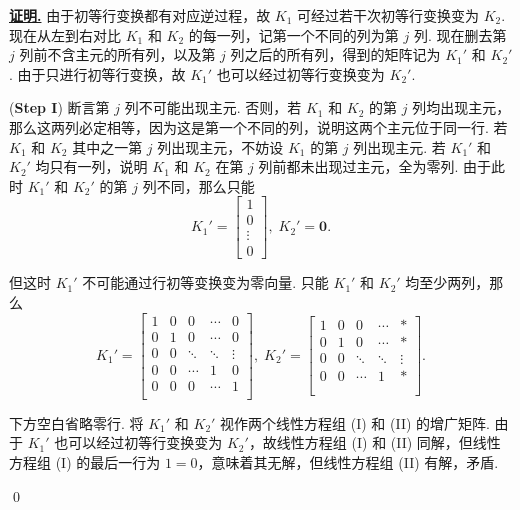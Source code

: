 \documentclass[10pt,openany]{article}
\theoremstyle{thmstyle} %
\theoremstyle{defstyle} %
\theoremstyle{prostyle} %
\theoremstyle{exastyle}
\theoremstyle{remstyle}
\renewenvironment{proof}[1][证明]{\par\underline{\textbf{#1.}} \;\fangsong}{\qed\par}
\begin{document}
\begin{proof}
	由于初等行变换都有对应逆过程，故 \( K_1 \) 可经过若干次初等行变换变为 \( K_2 \). 现在从左到右对比 \( K_1 \) 和 \( K_2 \) 的每一列，记第一个不同的列为第 \( j \) 列. 现在删去第 \( j \) 列前不含主元的所有列，以及第 \( j \) 列之后的所有列，得到的矩阵记为 \( K_1' \) 和 \( K_2' \). 由于只进行初等行变换，故 \( K_1' \) 也可以经过初等行变换变为 \( K_2' \).
	
	(\textbf{Step I}) 断言第 \( j \) 列不可能出现主元. 否则，若 \( K_1 \) 和 \( K_2 \) 的第 \( j \) 列均出现主元，那么这两列必定相等，因为这是第一个不同的列，说明这两个主元位于同一行. 若 \( K_1 \) 和 \( K_2 \) 其中之一第 \( j \) 列出现主元，不妨设 \( K_1 \) 的第 \( j \) 列出现主元. 若 \( K_1' \) 和 \( K_2' \) 均只有一列，说明 \( K_1 \) 和 \( K_2 \) 在第 \( j \) 列前都未出现过主元，全为零列. 由于此时 \( K_1' \) 和 \( K_2' \) 的第 \( j \) 列不同，那么只能
	\[ K_1'= \begin{bmatrix}
		1 \\ 0 \\ \vdots \\ 0
	\end{bmatrix}, \; K_2'= \bm{0}. \]
	
	但这时 \( K_1' \) 不可能通过行初等变换变为零向量. 只能 \( K_1' \) 和 \( K_2' \) 均至少两列，那么
	\[ K_1'= \begin{bmatrix}
		1 & 0 & 0  & \cdots & 0 \\
		0 & 1 & 0 & \cdots & 0 \\
		0 & 0 & \ddots & \ddots & \vdots \\
		0 & 0 & \cdots & 1 & 0 \\
		0 & 0 & 0 & \cdots & 1 \\
		 &  &  &  & 
	\end{bmatrix}, \; K_2'=\begin{bmatrix}
	1 & 0 & 0  & \cdots & * \\
	0 & 1 & 0   & \cdots & * \\
	0 & 0 & \ddots & \ddots & \vdots \\
	0 & 0  & \cdots & 1 & * \\
	 &  &  &  &   \\
	 &  &  &  &   
	\end{bmatrix}.  \]
	
	下方空白省略零行. 将 \( K_1' \) 和 \( K_2' \) 视作两个线性方程组 (I) 和 (II) 的增广矩阵. 由于 \( K_1' \) 也可以经过初等行变换变为 \( K_2' \)，故线性方程组 (I) 和 (II) 同解，但线性方程组 (I) 的最后一行为 \( 1=0 \)，意味着其无解，但线性方程组 (II) 有解，矛盾.
	

\end{proof}
\end{document}
